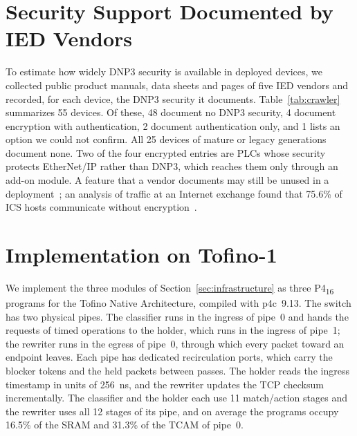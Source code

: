 \section{Security Support Documented by IED Vendors}
\label{app:crawler}

To estimate how widely DNP3 security is available in deployed devices, we collected public product manuals, data sheets and pages of five IED vendors and recorded, for each device, the DNP3 security it documents. Table~\ref{tab:crawler} summarizes 55 devices. Of these, 48 document no DNP3 security, 4 document encryption with authentication, 2 document authentication only, and 1 lists an option we could not confirm. All 25 devices of mature or legacy generations document none. Two of the four encrypted entries are PLCs whose security protects EtherNet/IP rather than DNP3, which reaches them only through an add-on module. A feature that a vendor documents may still be unused in a deployment~\cite{CISA2026SecureOT}; an analysis of traffic at an Internet exchange found that 75.6\% of ICS hosts communicate without encryption~\cite{barbieri2021}.

\begin{table}[h]
\centering
\caption{DNP3 security support documented by five IED vendors (device counts): encryption with authentication, authentication only, an unconfirmed option, and none.}
\label{tab:crawler}
\footnotesize

\end{table}

\section{Implementation on Tofino-1}
\label{app:tofino}

We implement the three modules of Section~\ref{sec:infrastructure} as three P4\textsubscript{16} programs for the Tofino Native Architecture, compiled with p4c~9.13. The switch has two physical pipes. The classifier runs in the ingress of pipe~0 and hands the requests of timed operations to the holder, which runs in the ingress of pipe~1; the rewriter runs in the egress of pipe~0, through which every packet toward an endpoint leaves. Each pipe has dedicated recirculation ports, which carry the blocker tokens and the held packets between passes. The holder reads the ingress timestamp in units of 256~ns, and the rewriter updates the TCP checksum incrementally. The classifier and the holder each use 11 match/action stages and the rewriter uses all 12 stages of its pipe, and on average the programs occupy 16.5\% of the SRAM and 31.3\% of the TCAM of pipe~0.
